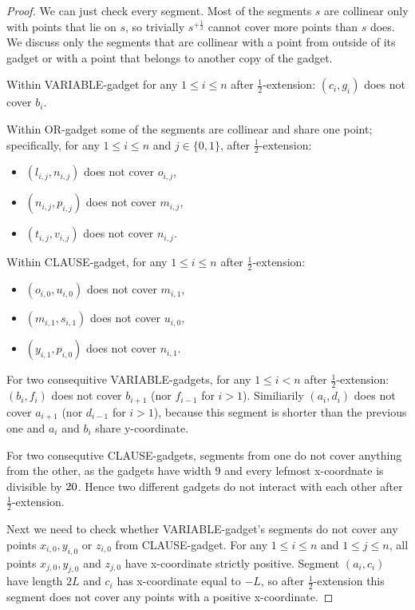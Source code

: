 \begin{proof}
We can just check every segment. Most of the segments $s$
are collinear only with points that lie on $s$,
so trivially $s^{+\frac{1}{2}}$ cannot cover more points than $s$ does.
We discuss only the segments that are collinear with
a point from outside of its gadget
or with a point that belongs to another copy of the gadget.

Within VARIABLE-gadget for any $1 \le i \le n$ after $\frac{1}{2}$-extension:
$(c_i,g_i)$ does not cover $b_i$.

Within OR-gadget some of the segments are collinear and share one point;
specifically, for any $1 \le i \le n$ and $j \in \{0,1\}$, after $\frac{1}{2}$-extension:
\begin{itemize}
\item $(l_{i,j}, n_{i,j})$ does not cover $o_{i,j}$,
\item $(n_{i,j}, p_{i,j})$ does not cover $m_{i,j}$,
\item $(t_{i,j}, v_{i,j})$ does not cover $n_{i,j}$.
\end{itemize}
Within CLAUSE-gadget, for any $1 \le i \le n$ after $\frac{1}{2}$-extension:
\begin{itemize}
\item $(o_{i,0}, u_{i,0})$ does not cover $m_{i,1}$,
\item $(m_{i,1}, s_{i,1})$ does not cover $u_{i,0}$,
\item $(y_{i,1}, p_{i,0})$ does not cover $n_{i,1}$.
\end{itemize}
For two consequitive VARIABLE-gadgets, for any $1 \le i < n$ after $\frac{1}{2}$-extension:
$(b_i, f_i)$ does not cover $b_{i+1}$ (nor $f_{i-1}$ for $i>1$).
Similiarily $(a_i,d_i)$ does not cover $a_{i+1}$ (nor $d_{i-1}$ for $i>1$),
because this segment is shorter than the previous one and $a_i$ and $b_i$
share y-coordinate.

For two consequtive CLAUSE-gadgets,
segments from one do not cover anything from the other,
as the gadgets have width 9 and
every lefmost x-coordnate is divisible by $20$.
Hence two different gadgets do not interact with each other
after $\frac{1}{2}$-extension.

Next we need to check whether VARIABLE-gadget's segments
do not cover any points $x_{i,0}, y_{i,0}$ or $z_{i,0}$ from CLAUSE-gadget.
For any $1 \le i \le n$ and $1 \le j \le n$, all points $x_{j,0}, y_{j,0}$ and $z_{j,0}$
have x-coordinate strictly positive. Segment $(a_i, c_i)$ have length $2L$
and $c_i$ has x-coordinate equal to $-L$, so after $\frac{1}{2}$-extension
this segment does not cover any points with a positive x-coordinate.
\end{proof}

